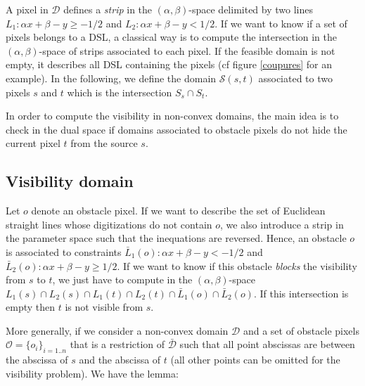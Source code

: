 \documentclass[fleqn,twoside]{article}
\begin{document}
A  pixel      in $\mathcal{D}$   defines  a     {\it  strip}   in  the
$(\alpha,\beta)$-space delimited by   two lines $L_1: \alpha   x+\beta
-y\geq-1/2$  and $L_2: \alpha  x+\beta -y<1/2$.  If we
want to know if a  set of pixels belongs to  a DSL, a classical way is
to compute the intersection   in the $(\alpha,\beta)$-space of  strips
associated to  each  pixel. If  the feasible  domain is not  empty, it
describes all  DSL containing the pixels  (cf figure \ref{coupures} for an
example).  In  the following, we  define the domain $\mathcal{S}(s,t)$
associated to two pixels $s$ and $t$ which is the intersection $S_s\cap S_t$.



In  order to  compute the  visibility in  non-convex domains, the main
idea is to check  in the dual  space if domains associated to obstacle
pixels do not hide the current pixel $t$ from the source $s$.





\subsection{Visibility domain}

Let $o$ denote  an obstacle pixel. If we  want to describe  the set of
Euclidean straight  lines whose digitizations  do not  contain $o$, we
also  introduce a  strip   in  the  parameter   space such   that  the
inequations  are  reversed.  Hence,  an obstacle $o$  is associated to
constraints  $\bar{L}_1(o): \alpha x+\beta -y<-1/2$ and $\bar{L}_2(o):
\alpha x+\beta -y\geq  1/2$. If we want to  know if this obstacle {\it
blocks} the visibility from $s$ to $t$, we just have to compute in the
$(\alpha,\beta)$-space $L_1(s)\cap L_2(s)\cap  L_1(t) \cap L_2(t) \cap
\bar{L}_1(o) \cap \bar{L}_2(o)$.  If  this intersection is  empty then
$t$ is not visible from $s$.


More generally, if we consider a non-convex domain $\mathcal{D}$ and a
set  of  obstacle  pixels  $\mathcal{O}=\{o_i\}_{i=1..n}$   that  is a
restriction of $\bar{\mathcal{D}}$  such that all point abscissas  are
between the abscissa of $s$ and the abscissa  of $t$ (all other points
can be omitted for the visibility problem). We have the lemma:
\end{document}
